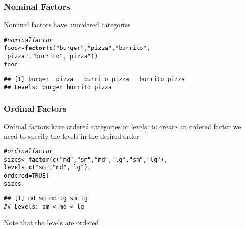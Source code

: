 \documentclass[12pt]{beamer}\usepackage[]{graphicx}\usepackage[]{color}
\makeatletter
\newcommand{\hlnum}[1]{\textcolor[rgb]{0.686,0.059,0.569}{#1}}%
\newcommand{\hlstr}[1]{\textcolor[rgb]{0.192,0.494,0.8}{#1}}%
\newcommand{\hlcom}[1]{\textcolor[rgb]{0.678,0.584,0.686}{\textit{#1}}}%
\newcommand{\hlstd}[1]{\textcolor[rgb]{0.345,0.345,0.345}{#1}}%
\newcommand{\hlkwb}[1]{\textcolor[rgb]{0.69,0.353,0.396}{#1}}%
\newcommand{\hlkwc}[1]{\textcolor[rgb]{0.333,0.667,0.333}{#1}}%
\newcommand{\hlkwd}[1]{\textcolor[rgb]{0.737,0.353,0.396}{\textbf{#1}}}%
\newenvironment{kframe}{%
 \def\at@end@of@kframe{}%
 \ifinner\ifhmode%
  \def\at@end@of@kframe{\end{minipage}}%
  \begin{minipage}{\columnwidth}%
 \fi\fi%
 \def\FrameCommand##1{\hskip\@totalleftmargin \hskip-\fboxsep
 \colorbox{shadecolor}{##1}\hskip-\fboxsep
     \hskip-\linewidth \hskip-\@totalleftmargin \hskip\columnwidth}%
 \MakeFramed {\advance\hsize-\width
   \@totalleftmargin\z@ \linewidth\hsize
   \@setminipage}}%
 {\par\unskip\endMakeFramed%
 \at@end@of@kframe}
\newenvironment{knitrout}{}{} %
\makeatother
\begin{document}

\begin{frame}[fragile]
\frametitle{Nominal Factors}

Nominal factors have unordered categories
\begin{knitrout}\footnotesize
{}\color{fgcolor}\begin{kframe}
\begin{alltt}
\hlcom{# nominal factor}
\hlstd{food} \hlkwb{<-} \hlkwd{factor}\hlstd{(}\hlkwd{c}\hlstd{(}\hlstr{"burger"}\hlstd{,} \hlstr{"pizza"}\hlstd{,} \hlstr{"burrito"}\hlstd{,}
                 \hlstr{"pizza"}\hlstd{,} \hlstr{"burrito"}\hlstd{,} \hlstr{"pizza"}\hlstd{))}
\hlstd{food}
\end{alltt}
\begin{verbatim}
## [1] burger  pizza   burrito pizza   burrito pizza  
## Levels: burger burrito pizza
\end{verbatim}
\end{kframe}
\end{knitrout}

\end{frame}


\begin{frame}[fragile]
\frametitle{Ordinal Factors}

Ordinal factors have ordered categories or levels; to create an ordered factor we need to specify the levels in the desired order
\begin{knitrout}\footnotesize
{}\color{fgcolor}\begin{kframe}
\begin{alltt}
\hlcom{# ordinal factor}
\hlstd{sizes} \hlkwb{<-} \hlkwd{factor}\hlstd{(}\hlkwd{c}\hlstd{(}\hlstr{"md"}\hlstd{,} \hlstr{"sm"}\hlstd{,} \hlstr{"md"}\hlstd{,} \hlstr{"lg"}\hlstd{,} \hlstr{"sm"}\hlstd{,} \hlstr{"lg"}\hlstd{),}
                \hlkwc{levels} \hlstd{=} \hlkwd{c}\hlstd{(}\hlstr{"sm"}\hlstd{,} \hlstr{"md"}\hlstd{,} \hlstr{"lg"}\hlstd{),}
                \hlkwc{ordered} \hlstd{=} \hlnum{TRUE}\hlstd{)}
\hlstd{sizes}
\end{alltt}
\begin{verbatim}
## [1] md sm md lg sm lg
## Levels: sm < md < lg
\end{verbatim}
\end{kframe}
\end{knitrout}
Note that the levels are ordered

\end{frame}
\end{document}
